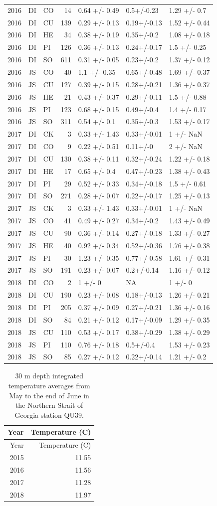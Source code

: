 \documentclass[fleqn,10pt]{wlpeerj} %
\begin{document}
\begin{longtable}[]{@{}lllrlll@{}}
2016 & DI & CO & 14 & 0.64 +/- 0.49 & 0.5+/-0.23 & 1.29 +/-
0.7\tabularnewline
2016 & DI & CU & 139 & 0.29 +/- 0.13 & 0.19+/-0.13 & 1.52 +/-
0.44\tabularnewline
2016 & DI & HE & 34 & 0.38 +/- 0.19 & 0.35+/-0.2 & 1.08 +/-
0.18\tabularnewline
2016 & DI & PI & 126 & 0.36 +/- 0.13 & 0.24+/-0.17 & 1.5 +/-
0.25\tabularnewline
2016 & DI & SO & 611 & 0.31 +/- 0.05 & 0.23+/-0.2 & 1.37 +/-
0.12\tabularnewline
2016 & JS & CO & 40 & 1.1 +/- 0.35 & 0.65+/-0.48 & 1.69 +/-
0.37\tabularnewline
2016 & JS & CU & 127 & 0.39 +/- 0.15 & 0.28+/-0.21 & 1.36 +/-
0.37\tabularnewline
2016 & JS & HE & 21 & 0.43 +/- 0.37 & 0.29+/-0.11 & 1.5 +/-
0.88\tabularnewline
2016 & JS & PI & 123 & 0.68 +/- 0.15 & 0.49+/-0.4 & 1.4 +/-
0.17\tabularnewline
2016 & JS & SO & 311 & 0.54 +/- 0.1 & 0.35+/-0.3 & 1.53 +/-
0.17\tabularnewline
2017 & DI & CK & 3 & 0.33 +/- 1.43 & 0.33+/-0.01 & 1 +/-
NaN\tabularnewline
2017 & DI & CO & 9 & 0.22 +/- 0.51 & 0.11+/-0 & 2 +/- NaN\tabularnewline
2017 & DI & CU & 130 & 0.38 +/- 0.11 & 0.32+/-0.24 & 1.22 +/-
0.18\tabularnewline
2017 & DI & HE & 17 & 0.65 +/- 0.4 & 0.47+/-0.23 & 1.38 +/-
0.43\tabularnewline
2017 & DI & PI & 29 & 0.52 +/- 0.33 & 0.34+/-0.18 & 1.5 +/-
0.61\tabularnewline
2017 & DI & SO & 271 & 0.28 +/- 0.07 & 0.22+/-0.17 & 1.25 +/-
0.13\tabularnewline
2017 & JS & CK & 3 & 0.33 +/- 1.43 & 0.33+/-0.01 & 1 +/-
NaN\tabularnewline
2017 & JS & CO & 41 & 0.49 +/- 0.27 & 0.34+/-0.2 & 1.43 +/-
0.49\tabularnewline
2017 & JS & CU & 90 & 0.36 +/- 0.14 & 0.27+/-0.18 & 1.33 +/-
0.27\tabularnewline
2017 & JS & HE & 40 & 0.92 +/- 0.34 & 0.52+/-0.36 & 1.76 +/-
0.38\tabularnewline
2017 & JS & PI & 30 & 1.23 +/- 0.35 & 0.77+/-0.58 & 1.61 +/-
0.31\tabularnewline
2017 & JS & SO & 191 & 0.23 +/- 0.07 & 0.2+/-0.14 & 1.16 +/-
0.12\tabularnewline
2018 & DI & CO & 2 & 1 +/- 0 & NA & 1 +/- 0\tabularnewline
2018 & DI & CU & 190 & 0.23 +/- 0.08 & 0.18+/-0.13 & 1.26 +/-
0.21\tabularnewline
2018 & DI & PI & 205 & 0.37 +/- 0.09 & 0.27+/-0.21 & 1.36 +/-
0.16\tabularnewline
2018 & DI & SO & 84 & 0.21 +/- 0.12 & 0.17+/-0.09 & 1.29 +/-
0.35\tabularnewline
2018 & JS & CU & 110 & 0.53 +/- 0.17 & 0.38+/-0.29 & 1.38 +/-
0.29\tabularnewline
2018 & JS & PI & 110 & 0.76 +/- 0.18 & 0.5+/-0.4 & 1.53 +/-
0.23\tabularnewline
2018 & JS & SO & 85 & 0.27 +/- 0.12 & 0.22+/-0.14 & 1.21 +/-
0.2\tabularnewline
\bottomrule
\end{longtable}

\begin{longtable}[]{@{}rr@{}}
\caption{\label{tab:ssttable} 30 m depth integrated temperature averages
from May to the end of June in the Northern Strait of Georgia station
QU39.}\tabularnewline
\toprule
Year & Temperature (C)\tabularnewline
\midrule
\endfirsthead
\toprule
Year & Temperature (C)\tabularnewline
\midrule
\endhead
2015 & 11.55\tabularnewline
2016 & 11.56\tabularnewline
2017 & 11.28\tabularnewline
2018 & 11.97\tabularnewline
\bottomrule
\end{longtable}
\end{document}

